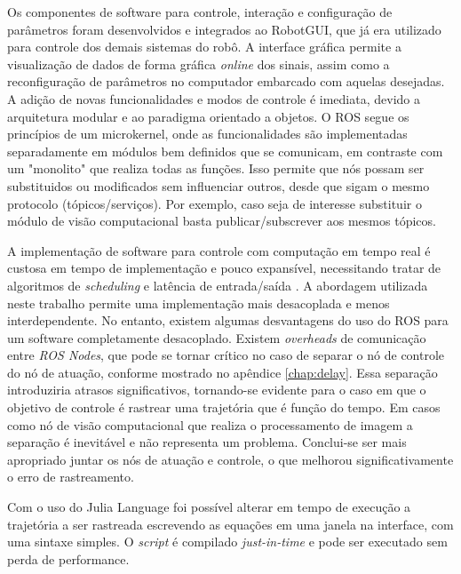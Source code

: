 Os componentes de software para controle, interação e configuração de parâmetros foram desenvolvidos e integrados ao RobotGUI, que já era utilizado para controle dos demais sistemas do robô. A interface gráfica permite a visualização de dados de forma gráfica \textit{online} dos sinais, assim como a reconfiguração de parâmetros no computador embarcado com aquelas desejadas. A adição de novas funcionalidades e modos de controle é imediata, devido a arquitetura modular e ao paradigma orientado a objetos. O ROS segue os princípios de um microkernel, onde as funcionalidades são implementadas separadamente em módulos bem definidos que se comunicam, em contraste com um "monolito" que realiza todas as funções. Isso permite que nós possam ser substituidos ou modificados sem influenciar outros, desde que sigam o mesmo protocolo (tópicos/serviços). Por exemplo, caso seja de interesse substituir o módulo de visão computacional basta publicar/subscrever aos mesmos tópicos.

A implementação de software para controle com computação em tempo real é custosa em tempo de implementação e pouco expansível, necessitando tratar de algoritmos de \textit{scheduling} e latência de entrada/saída \citep{nilsson1998real}. A abordagem utilizada neste trabalho permite uma implementação mais desacoplada e menos interdependente. No entanto, existem algumas desvantagens do uso do ROS para um software completamente desacoplado. Existem \textit{overheads} de comunicação entre \textit{ROS Nodes}, que pode se tornar crítico no caso de separar o nó de controle do nó de atuação, conforme mostrado no apêndice \ref{chap:delay}. Essa separação introduziria atrasos significativos, tornando-se evidente para o caso em que o objetivo de controle é rastrear uma trajetória que é função do tempo. Em casos como nó de visão computacional que realiza o processamento de imagem a separação é inevitável e não representa um problema. Conclui-se ser mais apropriado juntar os nós de atuação e controle, o que melhorou significativamente o erro de rastreamento. %

Com o uso do Julia Language foi possível alterar em tempo de execução a trajetória a ser rastreada escrevendo as equações em uma janela na interface, com uma sintaxe simples. O \textit{script} é compilado \textit{just-in-time} e pode ser executado sem perda de performance.

